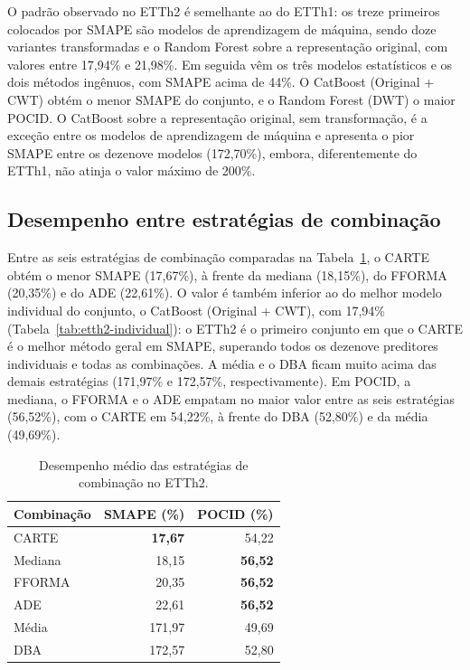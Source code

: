 O padrão observado no ETTh2 é semelhante ao do ETTh1: os treze primeiros colocados por SMAPE são modelos de aprendizagem de máquina, sendo doze variantes transformadas e o Random Forest sobre a representação original, com valores entre 17,94\% e 21,98\%. Em seguida vêm os três modelos estatísticos e os dois métodos ingênuos, com SMAPE acima de 44\%. O CatBoost (Original + CWT) obtém o menor SMAPE do conjunto, e o Random Forest (DWT) o maior POCID. O CatBoost sobre a representação original, sem transformação, é a exceção entre os modelos de aprendizagem de máquina e apresenta o pior SMAPE entre os dezenove modelos (172,70\%), embora, diferentemente do ETTh1, não atinja o valor máximo de 200\%.

\subsection{Desempenho entre estratégias de combinação}

Entre as seis estratégias de combinação comparadas na Tabela~\ref{tab:etth2-estaticas}, o CARTE obtém o menor SMAPE (17,67\%), à frente da mediana (18,15\%), do FFORMA (20,35\%) e do ADE (22,61\%). O valor é também inferior ao do melhor modelo individual do conjunto, o CatBoost (Original + CWT), com 17,94\% (Tabela~\ref{tab:etth2-individual}): o ETTh2 é o primeiro conjunto em que o CARTE é o melhor método geral em SMAPE, superando todos os dezenove preditores individuais e todas as combinações. A média e o DBA ficam muito acima das demais estratégias (171,97\% e 172,57\%, respectivamente). Em POCID, a mediana, o FFORMA e o ADE empatam no maior valor entre as seis estratégias (56,52\%), com o CARTE em 54,22\%, à frente do DBA (52,80\%) e da média (49,69\%).

\begin{table}[H]
\centering
\caption{Desempenho médio das estratégias de combinação no ETTh2.}
\label{tab:etth2-estaticas}
\begin{tabular}{@{}lrr@{}}
\toprule
\textbf{Combinação} & \textbf{SMAPE (\%)} & \textbf{POCID (\%)} \\
\midrule
CARTE   & \textbf{17,67} & 54,22 \\
Mediana & 18,15 & \textbf{56,52} \\
FFORMA  & 20,35 & \textbf{56,52} \\
ADE     & 22,61 & \textbf{56,52} \\
Média   & 171,97 & 49,69 \\
DBA     & 172,57 & 52,80 \\
\bottomrule
\end{tabular}
\end{table}

